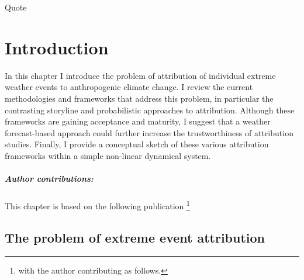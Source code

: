\begin{savequote}[8cm]
    Quote
\end{savequote}
    
\chapter{\label{intro}Introduction} 

In this chapter I introduce the problem of attribution of individual extreme weather events to anthropogenic climate change. I review the current methodologies and frameworks that address this problem, in particular the contrasting storyline and probabilistic approaches to attribution. Although these frameworks are gaining acceptance and maturity, I suggest that a weather forecast-based approach could further increase the trustworthiness of attribution studies. Finally, I provide a conceptual sketch of these various attribution frameworks within a simple non-linear dynamical system.
\small\paragraph{Author contributions:} This chapter is based on the following publication \footnote{with the author contributing as follows.} \par\vspace{1em}

\clearpage

\minitoc

\clearpage

\section{The problem of extreme event attribution}

